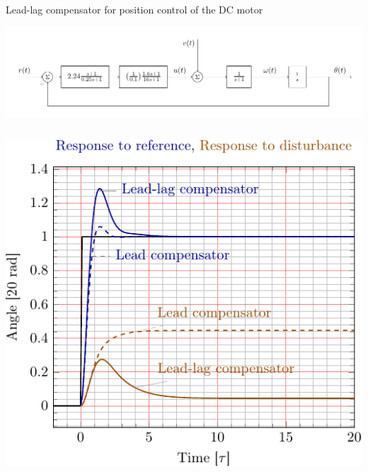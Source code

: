 \documentclass[presentation,aspectratio=169, usenames, dvipsnames]{beamer}
\begin{document}
\begin{frame}[label={sec:org21e4644}]{Lead-lag compensator for position control of the DC motor}
\begin{center}
 \includegraphics[width=.6\linewidth]{../../figures/block-DC-leadlag-compensator-numerical}
\end{center}

\pause

\begin{columns}
\begin{column}{0.5\columnwidth}
\begin{center}
  \includegraphics[width=.8\linewidth]{../../figures/response-leadlag-normalized-DC-crop}
\end{center}


\pause
\end{column}


\end{columns}
\end{frame}
\end{document}

